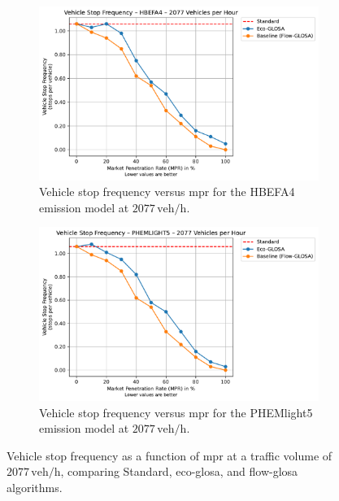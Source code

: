 \begin{figure}[htb]
  \centering
  \begin{subfigure}[b]{0.45\textwidth}
    \includegraphics[width=\textwidth]{data/img/VehicleStopFrequency/VehicleStopFrequency_HBEFA4_Cars2077.pdf}
    \caption{Vehicle stop frequency versus \ac{mpr} for the HBEFA4 emission model at $2077\,\mathrm{veh/h}$.}
    \label{fig:StopFreq_2077_HBEFA4}
  \end{subfigure}\hfill
  \begin{subfigure}[b]{0.45\textwidth}
    \includegraphics[width=\textwidth]{data/img/VehicleStopFrequency/VehicleStopFrequency_PHEMLIGHT5_Cars2077.pdf}
    \caption{Vehicle stop frequency versus \ac{mpr} for the PHEMlight5 emission model at $2077\,\mathrm{veh/h}$.}
    \label{fig:StopFreq_2077_PHEM}
  \end{subfigure}
  \caption{Vehicle stop frequency as a function of \ac{mpr} at a traffic volume of $2077\,\mathrm{veh/h}$, comparing Standard, \ac{eco-glosa}, and \ac{flow-glosa} algorithms.}
  \label{fig:StopFreq_2077}
\end{figure}


